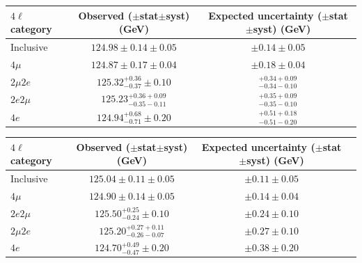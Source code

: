 \begin{table}[!htb]	
  \centering
  \renewcommand{\arraystretch}{1.6}
    \begin{tabular}{lcc}
      $4\ell$ category & Observed ($\pm$stat$\pm$syst) (GeV) & Expected uncertainty ($\pm$stat$\pm$syst)  (GeV) \\
      \hline
      Inclusive &	$124.98 \pm 0.14 \pm0.05$ & $ \pm 0.14 \pm 0.05$ \\
      $4\mu$ &	$124.87 \pm 0.17\pm0.04$ & $\pm 0.18 \pm 0.04$ \\
      $2\mu2e$ &	$125.32^{+0.36}_{-0.37}\pm0.10$ & $^{+0.34+0.09}_{-0.34-0.10}$ \\
      $2e2\mu$ &        $125.23^{+0.36+0.09}_{-0.35-0.11}$ & $^{+0.35+0.09}_{-0.35-0.10}$ \\
      ${4e}$ &    $124.94^{+0.68}_{-0.71} \pm 0.20$ & $^{+0.51+0.18}_{-0.51-0.20}$ \\
  \end{tabular}
  \label{table:Mass1Dresults}
\end{table}

\begin{table}[!htb]	
  \centering
  \renewcommand{\arraystretch}{1.6}
    \begin{tabular}{lccc}
      $4\ell$ category & Observed ($\pm$stat$\pm$syst) (GeV) & Expected uncertainty ($\pm$stat$\pm$syst) (GeV)  \\
      \hline
      Inclusive  & $125.04\pm0.11 \pm 0.05$	&	 $\pm 0.11\pm  0.05$ \\
      $4\mu$ & $124.90 \pm 0.14 \pm 0.05$	&	$\pm 0.14\pm  0.04$ \\
      $2e2\mu$ &        $125.50^{+0.25}_{-0.24}\pm0.10$      &       $\pm0.24\pm0.10$ \\
      $2\mu2e$ &        $125.20^{+0.27+0.11}_{-0.26-0.07}$     &        $\pm0.27\pm0.10$ \\
      $4e$ &	$124.70^{+0.49}_{-0.47}\pm0.20$     &	$\pm0.38\pm0.20$ \\ 
  \end{tabular}
  \label{table:Mass_results}
\end{table}

